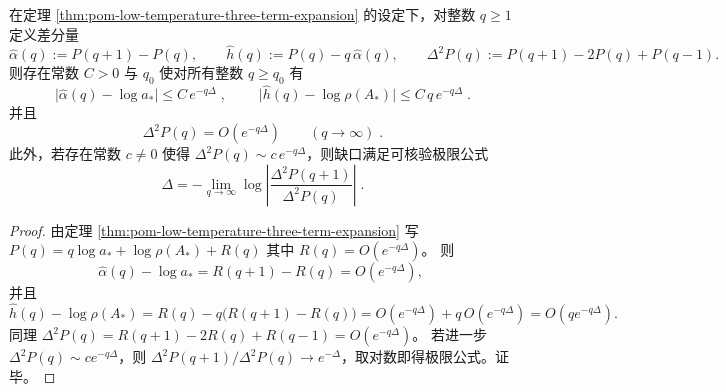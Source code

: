 \begin{theorem}\label{thm:pom-low-temperature-difference-certificates}
在定理 \ref{thm:pom-low-temperature-three-term-expansion} 的设定下，对整数 \(q\ge 1\) 定义差分量
\[
\widehat\alpha(q):=P(q+1)-P(q),\qquad
\widehat h(q):=P(q)-q\,\widehat\alpha(q),\qquad
\Delta^2P(q):=P(q+1)-2P(q)+P(q-1).
\]
则存在常数 \(C>0\) 与 \(q_0\) 使对所有整数 \(q\ge q_0\) 有
\[
\boxed{\;
\bigl|\widehat\alpha(q)-\log a_*\bigr|\le C\,e^{-q\Delta}\; },
\qquad
\boxed{\;
\bigl|\widehat h(q)-\log\rho(A_*)\bigr|\le C\,q\,e^{-q\Delta}\; }.
\]
并且
\[
\boxed{\;
\Delta^2P(q)=O(e^{-q\Delta})\qquad(q\to\infty)\; }.
\]
此外，若存在常数 \(c\neq 0\) 使得 \(\Delta^2P(q)\sim c\,e^{-q\Delta}\)，则缺口满足可核验极限公式
\[
\boxed{\;
\Delta=-\lim_{q\to\infty}\log\left|\frac{\Delta^2P(q+1)}{\Delta^2P(q)}\right|\; }.
\]
\end{theorem}
\begin{proof}
由定理 \ref{thm:pom-low-temperature-three-term-expansion} 写
\(
P(q)=q\log a_*+\log\rho(A_*)+R(q)
\)
其中 \(R(q)=O(e^{-q\Delta})\)。
则
\[
\widehat\alpha(q)-\log a_*=R(q+1)-R(q)=O(e^{-q\Delta}),
\]
并且
\[
\widehat h(q)-\log\rho(A_*)
=R(q)-q\bigl(R(q+1)-R(q)\bigr)
=O(e^{-q\Delta})+q\,O(e^{-q\Delta})
=O(qe^{-q\Delta}).
\]
同理
\(
\Delta^2P(q)=R(q+1)-2R(q)+R(q-1)=O(e^{-q\Delta})
\)。
若进一步 \(\Delta^2P(q)\sim c e^{-q\Delta}\)，则
\(
\Delta^2P(q+1)/\Delta^2P(q)\to e^{-\Delta}
\)，取对数即得极限公式。证毕。
\end{proof}


